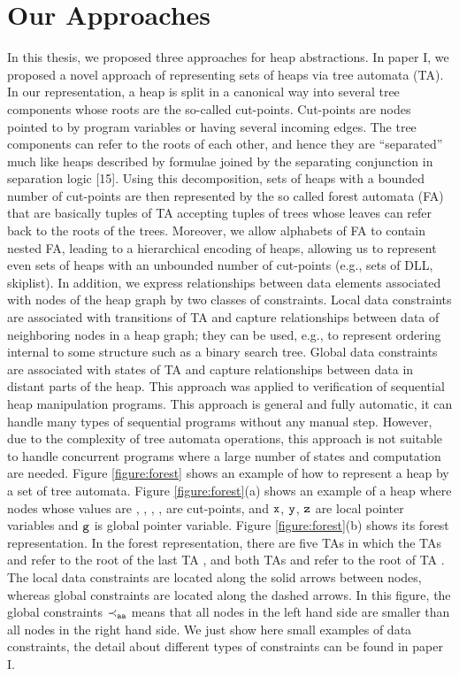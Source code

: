   
\section*{Our Approaches}
In this thesis, we proposed three approaches for heap abstractions. In paper I, we proposed a novel approach of representing sets of heaps via tree automata (TA). In our representation, a heap is split in a canonical way into several tree components whose roots are the so-called cut-points. Cut-points are nodes pointed to by program variables or having several incoming edges. The tree components can refer to the roots of each other, and hence they are “separated” much like heaps described by formulae joined by the separating conjunction in separation logic [15]. Using this decomposition, sets of heaps with a bounded number of cut-points are then represented by the so called forest automata (FA) that are basically tuples of TA accepting tuples of trees whose leaves can refer back to the roots of the trees. Moreover, we allow alphabets of FA to contain nested FA, leading to a hierarchical encoding of heaps, allowing us to represent even sets of heaps with an unbounded number of cut-points (e.g., sets of DLL, skiplist). 
In addition, we express relationships between data elements associated with nodes of the heap graph by two classes of constraints. Local data constraints are associated with transitions of TA and capture relationships between data of neighboring nodes in a heap graph; they can be used, e.g., to represent ordering internal to some structure such as a binary search tree. Global data constraints are associated with states of TA and capture relationships between data in distant parts of the heap. This approach was applied to verification of sequential heap manipulation programs. This approach is general and fully automatic, it can handle many types of sequential programs without any manual step. However, due to the complexity of tree automata operations, this approach is not suitable to handle concurrent programs where a large number of states and computation are needed. Figure \ref{figure:forest} shows an example of how to represent a heap by a set of tree automata. Figure \ref{figure:forest}(a) shows an example of a heap where nodes whose values are \nodea, \nodeb, \nodec, \noded, \nodee \; are cut-points, and $\tt x$, $\tt y$, $\tt z$ are local pointer variables and $\tt g$ is global pointer variable. Figure \ref{figure:forest}(b) shows its forest representation. In the forest representation, there are five TAs in which the TAs \taa \; and \tac \; refer to the root of the last TA \tae\;, and both TAs \tab \; and \tad \; refer to the root of TA \tac \;. The local data constraints are located along the solid arrows between nodes, whereas global constraints are located along the dashed arrows. In this figure, the global constraints $\tt \prec_{aa}$ means that all nodes in the left hand side are smaller than all nodes in the right hand side. We just show here small examples of data constraints, the detail about different types of constraints can be found in paper I.   

